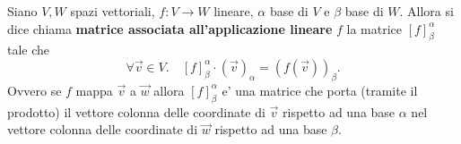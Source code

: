 \begin{definition}\label{matrice_associata}
    Siano $V, W$ spazi vettoriali, $f : V \to W$ lineare, $\alpha$ base di $V$ e $\beta$ base di $W$. Allora si dice chiama \textbf{matrice associata all'applicazione lineare} $f$ la matrice $[f]^{\alpha}_{\beta}$ tale che
    \begin{equation}
        \forall \vec{v} \in V. \quad  [f]^{\alpha}_{\beta} \cdot (\vec{v})_{\alpha}= \left(f(\vec{v}) \right)_{\beta}.
    \end{equation}
    Ovvero se $f$ mappa $\vec{v}$ a $\vec{w}$ allora $[f]^{\alpha}_{\beta}$ e' una matrice che porta (tramite il prodotto) il vettore colonna delle coordinate di $\vec{v}$ rispetto ad una base $\alpha$ nel vettore colonna delle coordinate di $\vec{w}$ rispetto ad una base $\beta$.
\end{definition}

